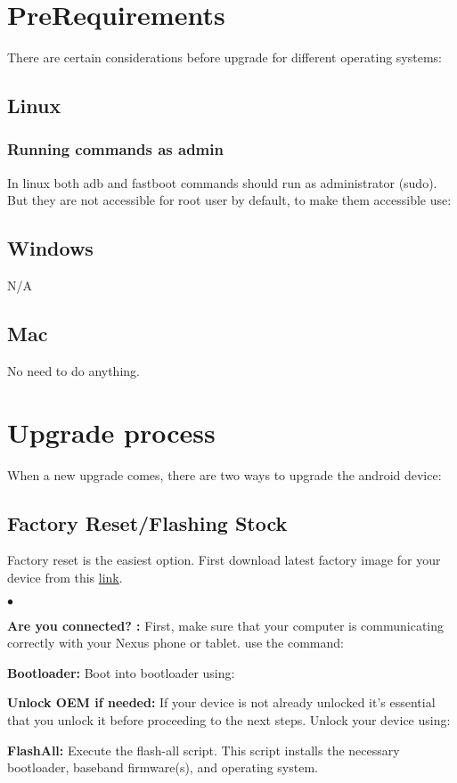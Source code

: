 
\section{PreRequirements}
There are certain considerations before upgrade for different operating systems:

\subsection{Linux}
\subsubsection{Running commands as admin}
In linux both adb and fastboot commands should run as administrator (sudo). But they are not accessible for root user by default, to make them accessible use:


\subsection{Windows}
N/A
\subsection{Mac}
No need to do anything.

\section{Upgrade process}
When a new upgrade comes, there are two ways to upgrade the android device:
\subsection{Factory Reset/Flashing Stock}
Factory reset is the easiest option. First download latest factory image for your device from this \href{https://developers.google.com/android/nexus/images}{link}.

\begin{list}{$\bullet$}{}
	\item {\textbf{Are you connected? :}}\newline
		First, make sure that your computer is communicating correctly with your Nexus phone or tablet. use the command: 
	\item {\textbf{Bootloader:}} 
		Boot into bootloader using: 
	\item {\textbf{Unlock OEM if needed:}}\newline
		If your device is not already unlocked it's essential that you unlock it before proceeding to the next steps. Unlock your device using: 
	\item {\textbf{FlashAll:}}\newline
		Execute the flash-all script. This script installs the necessary bootloader, baseband firmware(s), and operating system.\newline
\end{list}

